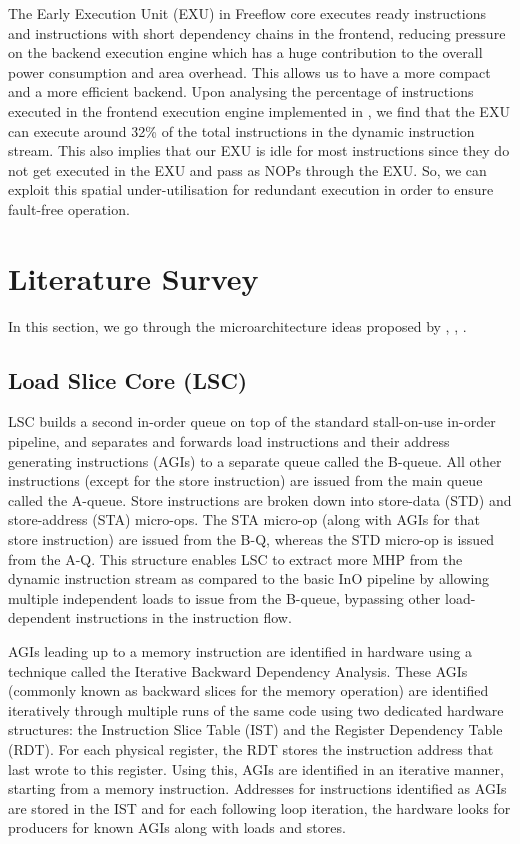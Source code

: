 \documentclass[a4paper,12pt, final]{report}
\begin{document}
The Early Execution Unit (EXU) in Freeflow core \cite{freeflow} executes ready instructions and instructions with short dependency chains in the frontend, reducing pressure on the backend execution engine which has a huge contribution to the overall power consumption and area overhead. This allows us to have a more compact and a more efficient backend. Upon analysing the percentage of instructions executed in the frontend execution engine implemented in \cite{freeflow}, we find that the EXU can execute around 32\% of the total instructions in the dynamic instruction stream. This also implies that our EXU is idle for most instructions since they do not get executed in the EXU and pass as NOPs through the EXU. So, we can exploit this spatial under-utilisation for redundant execution in order to ensure fault-free operation.

\chapter{Literature Survey}

In this section, we go through the microarchitecture ideas proposed by \cite{loadslice}, \cite{forwardslice}, \cite{freeflow}.

\section{Load Slice Core (LSC)}

LSC builds a second in-order queue on top of the standard stall-on-use in-order pipeline, and separates and forwards load instructions and their address generating instructions (AGIs) to a separate queue called the B-queue. All other instructions (except for the store instruction) are issued from the main queue called the A-queue. Store instructions are broken down into store-data (STD) and store-address (STA) micro-ops. The STA micro-op (along with AGIs for that store instruction) are issued from the B-Q, whereas the STD micro-op is issued from the A-Q. This structure enables LSC to extract more MHP from the dynamic instruction stream as compared to the basic InO pipeline by allowing multiple independent loads to issue from the B-queue, bypassing other load-dependent instructions in the instruction flow.

AGIs leading up to a memory instruction are identified in hardware using a technique called the Iterative Backward Dependency Analysis. These AGIs (commonly known as backward slices for the memory operation) are identified iteratively through multiple runs of the same code using two dedicated hardware structures: the Instruction Slice Table (IST) and the Register Dependency Table (RDT). For each physical register, the RDT stores the instruction address that last wrote to this register. Using this, AGIs are identified in an iterative manner, starting from a memory instruction. Addresses for instructions identified as AGIs are stored in the IST and for each following loop iteration, the hardware looks for producers for known AGIs along with loads and stores.
\end{document}
